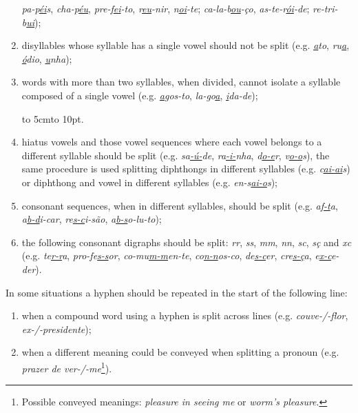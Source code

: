 \documentclass{article}
\begin{document}
\begin{enumerate}
	\emph{pa-p\underline{\emph{éi}}s}, \emph{cha-p\underline{\emph{éu}}}, 
	\emph{pre-f\underline{\emph{ei}}-to}, \emph{r\underline{\emph{eu}}-nir},
	\emph{n\underline{\emph{oi}}-te}; \emph{ca-la-b\underline{\emph{ou}}-ço}, 
	\emph{as-te-r\underline{\emph{ói}}-de}; 
	\emph{re-tri-b\underline{\emph{ui}}});
    \item\label{rule-singlev} disyllables whose syllable has a single vowel should 
	not be split (e.g. \emph{\underline{\emph{a}}to}, \emph{ru\underline{\emph{a}}}, 
	\emph{\underline{\emph{ó}}dio}, \emph{\underline{\emph{u}}nha});
    \item\label{rule-orphan} words with more than two syllables, when divided, cannot 
	isolate a syllable composed of a single vowel (e.g. \emph{\underline{\emph{a}}gos-to}, 
	\emph{la-go\underline{\emph{a}}}, \emph{\underline{\emph{i}}da-de});


    \hspace{10em} \hbox to 5cm{\leaders\hbox to 10pt{\hss . \hss}\hfil} 

    \item\label{rule-hiatus} hiatus vowels and those vowel sequences where each vowel
	belongs to a different syllable should be split (e.g.
	\emph{sa\underline{\emph{-ú-}}de}, \emph{ra\underline{\emph{-i-}}nha}, \emph{d\underline{\emph{o-e}}r},
	\emph{v\underline{\emph{o-o}}s}), the same procedure is used splitting diphthongs
	in different syllables (e.g. \emph{c\underline{\emph{ai-ai}}s}) or diphthong and
	vowel in different syllables (e.g. \emph{en-s\underline{\emph{ai-o}}s});
    \item\label{rule-consonants} consonant sequences, when in different syllables, should
	be split (e.g. \emph{a\underline{\emph{f-t}}a}, \emph{a\underline{\emph{b-d}}i-car},
	\emph{re\underline{\emph{s-c}}i-são}, \emph{a\underline{\emph{b-s}}o-lu-to});
    \item\label{rule-digraphs} the following consonant digraphs should be split:
	\emph{rr}, \emph{ss}, \emph{mm}, \emph{nn}, \emph{sc}, \emph{sç} and
	\emph{xc} (e.g. \emph{te\underline{\emph{r-r}}a}, \emph{pro-fe\underline{\emph{s-s}}or},
	\emph{co-mu\underline{\emph{m-m}}en-te}, \emph{co\underline{\emph{n-n}}os-co},
	\emph{de\underline{\emph{s-c}}er}, \emph{cre\underline{\emph{s-ç}}a}, \emph{e\underline{\emph{x-c}}e-der}).
\end{enumerate}


In some situations a hyphen should be repeated in the start of the following
line: 
\begin{enumerate}
\item when a compound word using a hyphen is split across lines (e.g.
    \emph{couve-/-flor}, \emph{ex-/-presidente});
\item when a different meaning could be conveyed when splitting a pronoun (e.g.
    \emph{prazer de ver-/-me}\footnote{Possible conveyed meanings: 
    \emph{pleasure in seeing me} or \emph{worm's pleasure}.}). 
\end{enumerate}
\end{document}
